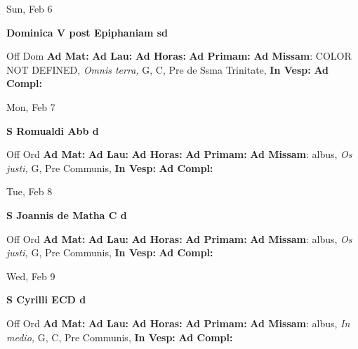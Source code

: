 \documentclass[10pt]{book}
\begin{document}
\begin{center}
\begin{minipage}{3.5in}
\vspace{2em}
\begin{center}Sun, Feb 6
\end{center}
\textbf{ \large Dominica V post Epiphaniam
\textnormal{\normalsize sd}}

\begin{justify}Off Dom
\textbf{Ad Mat: }
\textbf{Ad Lau: }
\textbf{Ad Horas: }
\textbf{Ad Primam: }\textbf{Ad Missam}: COLOR NOT DEFINED, \textit{Omnis terra,} G, C, Pre de Ssma Trinitate, 
\textbf{In Vesp: }
\textbf{Ad Compl: }
\end{justify}
\end{minipage}
\end{center}

\begin{center}
\begin{minipage}{3.5in}
\vspace{2em}
\begin{center}Mon, Feb 7
\end{center}
\textbf{ \large S Romualdi Abb
\textnormal{\normalsize d}}

\begin{justify}Off Ord
\textbf{Ad Mat: }
\textbf{Ad Lau: }
\textbf{Ad Horas: }
\textbf{Ad Primam: }\textbf{Ad Missam}: albus, \textit{Os justi,} G, Pre Communis, 
\textbf{In Vesp: }
\textbf{Ad Compl: }
\end{justify}
\end{minipage}
\end{center}

\begin{center}
\begin{minipage}{3.5in}
\vspace{2em}
\begin{center}Tue, Feb 8
\end{center}
\textbf{ \large S Joannis de Matha C
\textnormal{\normalsize d}}

\begin{justify}Off Ord
\textbf{Ad Mat: }
\textbf{Ad Lau: }
\textbf{Ad Horas: }
\textbf{Ad Primam: }\textbf{Ad Missam}: albus, \textit{Os justi,} G, Pre Communis, 
\textbf{In Vesp: }
\textbf{Ad Compl: }
\end{justify}
\end{minipage}
\end{center}

\begin{center}
\begin{minipage}{3.5in}
\vspace{2em}
\begin{center}Wed, Feb 9
\end{center}
\textbf{ \large S Cyrilli ECD
\textnormal{\normalsize d}}

\begin{justify}Off Ord
\textbf{Ad Mat: }
\textbf{Ad Lau: }
\textbf{Ad Horas: }
\textbf{Ad Primam: }\textbf{Ad Missam}: albus, \textit{In medio,} G, C, Pre Communis, 
\textbf{In Vesp: }
\textbf{Ad Compl: }
\end{justify}
\end{minipage}
\end{center}
\end{document}
